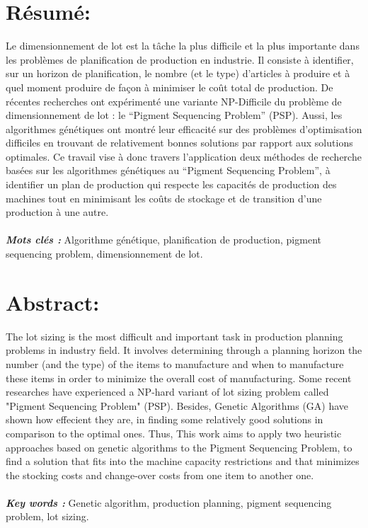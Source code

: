 \documentclass[12pt,a4paper]{article}
\begin{document}
	\newpage %
	
	\section*{Résumé:}
	
	\vspace{1cm}
	
	Le dimensionnement de lot est la tâche la plus difficile et la plus importante dans les problèmes de planification de production en industrie. Il consiste à identifier, sur un horizon de planification, le nombre (et le type) d’articles à produire et à quel moment produire de façon à minimiser le coût total de production. De récentes recherches ont expérimenté une variante NP-Difficile du problème de dimensionnement de lot : le “Pigment Sequencing Problem” (PSP). Aussi, les algorithmes génétiques ont montré leur efficacité sur des problèmes d’optimisation difficiles en trouvant de relativement bonnes solutions par rapport aux solutions optimales. Ce travail vise à donc travers l'application deux méthodes de recherche basées sur les algorithmes génétiques au “Pigment Sequencing Problem”, à identifier un plan de production qui respecte les capacités de production des machines tout en minimisant les coûts de stockage et de transition d’une production à une autre. \\
	\\
	\hspace*{.5cm}\textsl{\textbf{Mots clés :}} Algorithme génétique, planification de production, pigment sequencing problem, dimensionnement de lot.
	
	\newpage %
	
	\section*{Abstract:}
	
	\vspace{1cm}
	
	The lot sizing is the most difficult and important task in production planning problems in industry field. It involves determining through a planning horizon the number (and the type) of the items to manufacture and when to manufacture these items in order to minimize the overall cost of manufacturing. Some recent researches have experienced a NP-hard variant of lot sizing problem called "Pigment Sequencing Problem" (PSP). Besides, Genetic Algorithms (GA) have shown how effecient they are, in finding some relatively good solutions in comparison to the optimal ones. Thus, This work aims to apply two heuristic approaches based on genetic algorithms to the Pigment Sequencing Problem, to find a solution that fits into the machine capacity restrictions and that minimizes the stocking costs and change-over costs from one item to another one.\\
	\\
	\hspace*{.5cm}\textsl{\textbf{Key words :}} Genetic algorithm, production planning, pigment sequencing problem, lot sizing.
	
\end{document}
